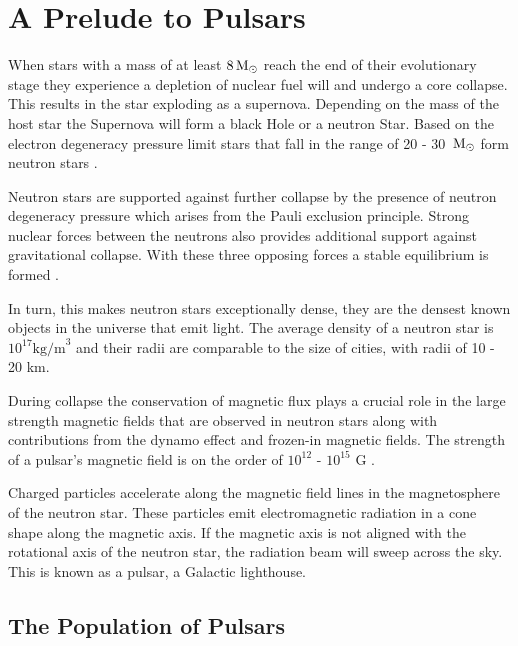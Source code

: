 \setcounter{page}{1} 
\section{A Prelude to Pulsars} \label{sec:prelude}
When stars with a mass of at least $8 \, \text{M}_\odot$ reach the end of their evolutionary stage they experience a depletion of nuclear fuel will and undergo a core collapse.  This results in the star exploding as a supernova. Depending on the mass of the host star the Supernova will form a black Hole or a neutron Star. Based on the electron degeneracy pressure limit \citep[pp. 434 -- 443]{chandrasekhar_introduction_2012} stars that fall in the range of 20 - 30 $\, \text{M}_\odot$ form neutron stars \citep{heger_how_2003}. \

Neutron stars are supported against further collapse by the presence of neutron degeneracy pressure which arises from the Pauli exclusion principle. Strong nuclear forces between the neutrons also provides additional support against gravitational collapse. With these three opposing forces a stable equilibrium is formed \citep{1983bhwd.book.....S}. \

In turn, this makes neutron stars exceptionally dense, they are the densest known objects in the universe that emit light. The average density of a neutron star is $10^{17} \text{kg/m}^3$ \citep{baym_neutron_1971} and their radii are comparable to the size of cities, with radii of 10 - 20 km. \

During collapse the conservation of magnetic flux plays a crucial role in the large strength magnetic fields that are observed in neutron stars along with contributions from the dynamo effect and frozen-in magnetic fields. The strength of a pulsar's magnetic field is on the order of $10^{12}$ - $10^{15}$ G \citep{michel_theory_1982}. \

Charged particles accelerate along the magnetic field lines in the magnetosphere of the neutron star. These particles emit electromagnetic radiation in a cone shape along the magnetic axis. If the magnetic axis is not aligned with the rotational axis of the neutron star, the radiation beam will sweep across the sky. This is known as a pulsar, a Galactic lighthouse.%

\subsection{The Population of Pulsars}

